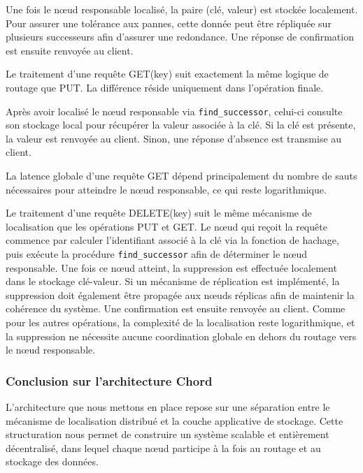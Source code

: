 Une fois le n\oe ud responsable localis\'e, la paire (cl\'e, valeur) est stock\'ee localement. Pour assurer une tol\'erance aux pannes, cette donn\'ee peut \^etre r\'epliqu\'ee sur plusieurs successeurs afin d'assurer une redondance. Une r\'eponse de confirmation est ensuite renvoy\'ee au client.


Le traitement d'une requ\^ete GET(key) suit exactement la m\^eme logique de routage que PUT. La diff\'erence r\'eside uniquement dans l'op\'eration finale.

Apr\`es avoir localis\'e le n\oe ud responsable via \texttt{find\_successor}, celui-ci consulte son stockage local pour r\'ecup\'erer la valeur associ\'ee \`a la cl\'e. Si la cl\'e est pr\'esente, la valeur est renvoy\'ee au client. Sinon, une r\'eponse d'absence est transmise au client.

La latence globale d'une requ\^ete GET d\'epend principalement du nombre de sauts n\'ecessaires pour atteindre le n\oe ud responsable, ce qui reste logarithmique.


Le traitement d'une requ\^ete DELETE(key) suit le m\^eme m\'ecanisme de localisation que les op\'erations PUT et GET. Le n\oe ud qui re\c coit la requ\^ete commence par calculer l'identifiant associ\'e \`a la cl\'e via la fonction de hachage, puis ex\'ecute la proc\'edure \texttt{find\_successor} afin de d\'eterminer le n\oe ud responsable. Une fois ce n\oe ud atteint, la suppression est effectu\'ee localement dans le stockage cl\'e-valeur. Si un m\'ecanisme de r\'eplication est impl\'ement\'e, la suppression doit \'egalement \^etre propag\'ee aux n\oe uds r\'eplicas afin de maintenir la coh\'erence du syst\`eme. Une confirmation est ensuite renvoy\'ee au client. Comme pour les autres op\'erations, la complexit\'e de la localisation reste logarithmique, et la suppression ne n\'ecessite aucune coordination globale en dehors du routage vers le n\oe ud responsable.

\subsubsection{Conclusion sur l'architecture Chord}

L'architecture que nous mettons en place repose sur une s\'eparation entre le m\'ecanisme de localisation distribu\'e et la couche applicative de stockage. Cette structuration nous permet de construire un syst\`eme scalable et enti\`erement d\'ecentralis\'e, dans lequel chaque n\oe ud participe \`a la fois au routage et au stockage des donn\'ees.

